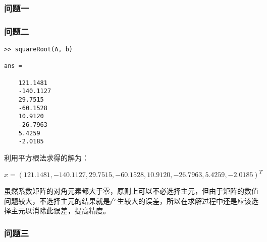 \subsubsection{问题一}

\subsubsection{问题二}

\begin{lstlisting}[frame=single]
>> squareRoot(A, b)

ans =

    121.1481
    -140.1127
    29.7515
    -60.1528
    10.9120
    -26.7963
    5.4259
    -2.0185

\end{lstlisting}

利用平方根法求得的解为：

\[x = (121.1481, -140.1127, 29.7515, -60.1528, 10.9120, -26.7963, 5.4259, -2.0185)^T\]

虽然系数矩阵的对角元素都大于零，原则上可以不必选择主元，但由于矩阵的数值问题较大，不选择主元的结果就是产生较大的误差，所以在求解过程中还是应该选择主元以消除此误差，提高精度。

\subsubsection{问题三}
